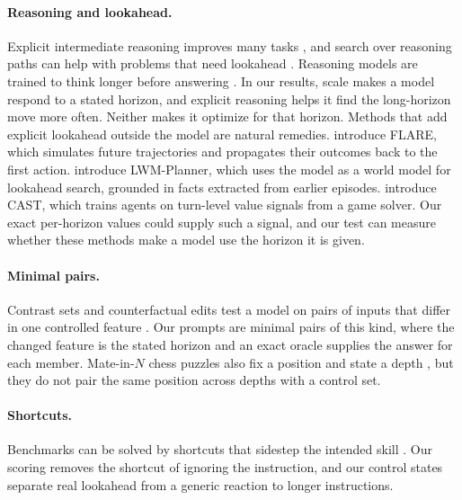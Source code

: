 \paragraph{Reasoning and lookahead.} Explicit intermediate reasoning improves many tasks \citep{wei2022cot}, and search over reasoning paths can help with problems that need lookahead \citep{yao2023tot}. Reasoning models are trained to think longer before answering \citep{deepseek2025r1,yang2025qwen3,openai2025gptoss}. In our results, scale makes a model respond to a stated horizon, and explicit reasoning helps it find the long-horizon move more often. Neither makes it optimize for that horizon. Methods that add explicit lookahead outside the model are natural remedies. \citet{wang2026reasoningfails} introduce FLARE, which simulates future trajectories and propagates their outcomes back to the first action. \citet{holt2025lwmplanner} introduce LWM-Planner, which uses the model as a world model for lookahead search, grounded in facts extracted from earlier episodes. \citet{wang2026cast} introduce CAST, which trains agents on turn-level value signals from a game solver. Our exact per-horizon values could supply such a signal, and our test can measure whether these methods make a model use the horizon it is given.

\paragraph{Minimal pairs.} Contrast sets and counterfactual edits test a model on pairs of inputs that differ in one controlled feature \citep{gardner2020contrast,kaushik2020counterfactual}. Our prompts are minimal pairs of this kind, where the changed feature is the stated horizon and an exact oracle supplies the answer for each member. Mate-in-$N$ chess puzzles also fix a position and state a depth \citep{srivastava2023bigbench}, but they do not pair the same position across depths with a control set.

\paragraph{Shortcuts.} Benchmarks can be solved by shortcuts that sidestep the intended skill \citep{geirhos2020shortcut}. Our scoring removes the shortcut of ignoring the instruction, and our control states separate real lookahead from a generic reaction to longer instructions.
